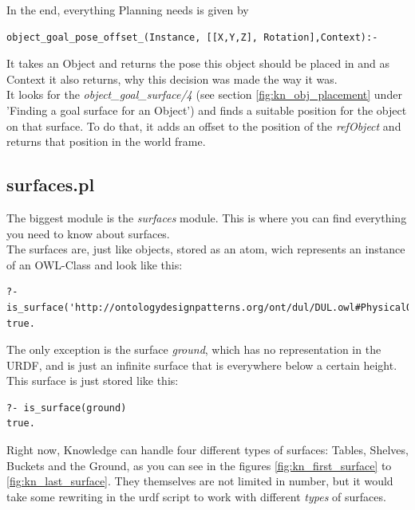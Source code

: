 \documentclass[main.tex]{subfiles}
\begin{document}
In the end, everything Planning needs is given by
\begin{lstlisting}
object_goal_pose_offset_(Instance, [[X,Y,Z], Rotation],Context):-
\end{lstlisting}
It takes an Object and returns the pose this object should be placed in and as Context it also returns, why this decision was made the way it was.\\
It looks for the \textit{object\_goal\_surface/4} (see section \ref{fig:kn_obj_placement} under 'Finding a goal surface for an Object') and finds a suitable position for the object on that surface. To do that, it adds an offset to the position of the \textit{refObject} and returns that position in the world frame.

\subsection{surfaces.pl}

The biggest module is the \textit{surfaces} module. This is where you can find everything you need to know about surfaces.\\
The surfaces are, just like objects, stored as an atom, wich represents an instance of an OWL-Class and look like this:
\begin{lstlisting}
?- is_surface('http://ontologydesignpatterns.org/ont/dul/DUL.owl#PhysicalObject_UHOJSVEC')
true.
\end{lstlisting}
The only exception is the surface \textit{ground}, which has no representation in the URDF, and is just an infinite surface that is everywhere below a certain height. This surface is just stored like this:
\begin{lstlisting}
?- is_surface(ground)
true.
\end{lstlisting}

Right now, Knowledge can handle four different types of surfaces: Tables, Shelves, Buckets and the Ground, as you can see in the figures \ref{fig:kn_first_surface} to \ref{fig:kn_last_surface}. They themselves are not limited in number, but it would take some rewriting in the urdf script to work with different \textit{types} of surfaces.
\end{document}
